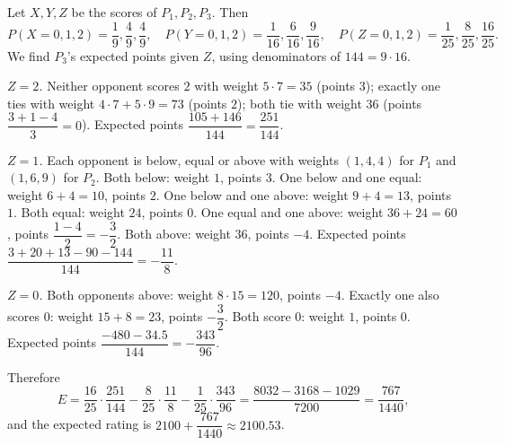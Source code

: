 Let $X,Y,Z$ be the scores of $P_1,P_2,P_3$. Then
\[P(X=0,1,2)=\dfrac19,\dfrac49,\dfrac49,\quad P(Y=0,1,2)=\dfrac1{16},\dfrac6{16},\dfrac9{16},\quad P(Z=0,1,2)=\dfrac1{25},\dfrac8{25},\dfrac{16}{25}.\]
We find $P_3$'s expected points given $Z$, using denominators of $144=9\cdot16$.

\emph{$Z=2$.} Neither opponent scores $2$ with weight $5\cdot7=35$ (points $3$); exactly one ties with weight $4\cdot7+5\cdot9=73$ (points $2$); both tie with weight $36$ (points $\dfrac{3+1-4}3=0$). Expected points $\dfrac{105+146}{144}=\dfrac{251}{144}$.

\emph{$Z=1$.} Each opponent is below, equal or above with weights $(1,4,4)$ for $P_1$ and $(1,6,9)$ for $P_2$. Both below: weight $1$, points $3$. One below and one equal: weight $6+4=10$, points $2$. One below and one above: weight $9+4=13$, points $1$. Both equal: weight $24$, points $0$. One equal and one above: weight $36+24=60$, points $\dfrac{1-4}2=-\dfrac32$. Both above: weight $36$, points $-4$. Expected points $\dfrac{3+20+13-90-144}{144}=-\dfrac{11}8$.

\emph{$Z=0$.} Both opponents above: weight $8\cdot15=120$, points $-4$. Exactly one also scores $0$: weight $15+8=23$, points $-\dfrac32$. Both score $0$: weight $1$, points $0$. Expected points $\dfrac{-480-34.5}{144}=-\dfrac{343}{96}$.

Therefore
\[E=\dfrac{16}{25}\cdot\dfrac{251}{144}-\dfrac8{25}\cdot\dfrac{11}8-\dfrac1{25}\cdot\dfrac{343}{96}=\dfrac{8032-3168-1029}{7200}=\dfrac{767}{1440},\]
and the expected rating is $\boxed{2100+\dfrac{767}{1440}}\approx2100.53$.
